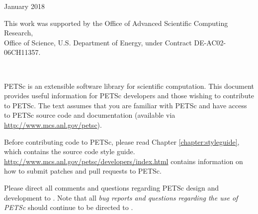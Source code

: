 \vspace*{30pt}
\noindent January 2018

\vspace*{20pt}
\noindent This work was supported by the Office of Advanced Scientific Computing Research, \\
Office of Science, U.S. Department of Energy, under Contract DE-AC02-06CH11357.


\newpage

\hbox{ }

\vspace{1in}
\date{\today}

\pagestyle{empty}
\newpage

\medskip \medskip

%
%

\medskip \medskip
PETSc is an extensible software library for scientific
computation. This document provides useful information for PETSc
developers and those wishing to contribute to PETSc. The text assumes
that you are familiar with PETSc and have access to PETSc source code
and documentation (available
via \href{http://www.mcs.anl.gov/petsc}{http://www.mcs.anl.gov/petsc}).

Before contributing code to PETSc, please read Chapter \ref{chapter:styleguide}, which contains the source code style guide.
\href{http://www.mcs.anl.gov/petsc/developers/index.html}{http://www.mcs.anl.gov/petsc/developers/index.html}
contains information on how to submit patches and pull requests to PETSc.

\vspace{1cm}

Please direct all comments and questions regarding PETSc design and
development to .  Note that all {\em
bug reports and questions regarding the use of PETSc} should continue
to be directed to .

%
%

\newpage
\hbox{ }
\newpage

\tableofcontents

